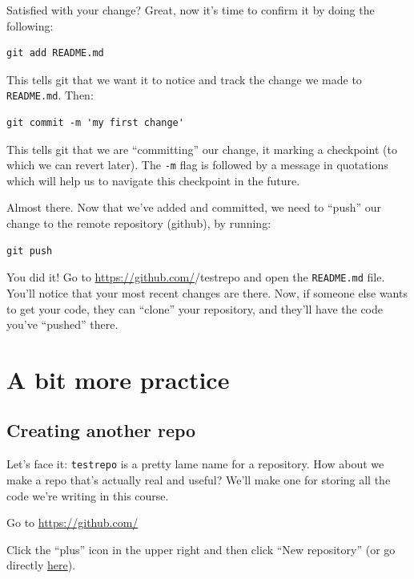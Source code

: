 \documentclass[
]{book}
\begin{document}
Satisfied with your change? Great, now it's time to confirm it by doing the following:

\begin{verbatim}
git add README.md
\end{verbatim}

This tells git that we want it to notice and track the change we made to \texttt{README.md}. Then:

\begin{verbatim}
git commit -m 'my first change'
\end{verbatim}

This tells git that we are ``committing'' our change, it marking a checkpoint (to which we can revert later). The \texttt{-m} flag is followed by a message in quotations which will help us to navigate this checkpoint in the future.

Almost there. Now that we've added and committed, we need to ``push'' our change to the remote repository (github), by running:

\begin{verbatim}
git push
\end{verbatim}

You did it! Go to \url{https://github.com/}/testrepo and open the \texttt{README.md} file. You'll notice that your most recent changes are there. Now, if someone else wants to get your code, they can ``clone'' your repository, and they'll have the code you've ``pushed'' there.

\hypertarget{a-bit-more-practice}{%
\section*{A bit more practice}\label{a-bit-more-practice}}

\hypertarget{creating-another-repo}{%
\subsection*{Creating another repo}\label{creating-another-repo}}

Let's face it: \texttt{testrepo} is a pretty lame name for a repository. How about we make a repo that's actually real and useful? We'll make one for storing all the code we're writing in this course.

Go to \url{https://github.com/}

Click the ``plus'' icon in the upper right and then click ``New repository'' (or go directly \href{https://github.com/new}{here}).
\end{document}

